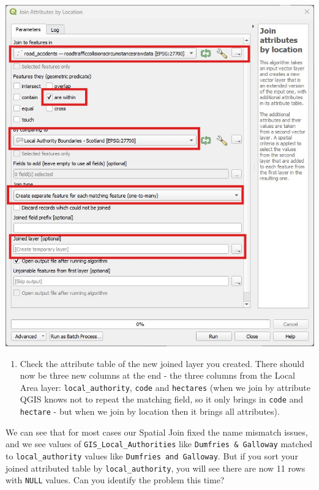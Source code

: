 \documentclass[
  letterpaper,
  DIV=11,
  numbers=noendperiod]{scrreprt}
\providecommand{\tightlist}{%
  \setlength{\itemsep}{0pt}\setlength{\parskip}{0pt}}\usepackage{longtable,booktabs,array}
\begin{document}
\includegraphics{images/lab_11/lab_11_fig_5_spatial_join.jpg}

\begin{enumerate}
\def\labelenumi{(\arabic{enumi})}
\setcounter{enumi}{316}
\tightlist
\item
  Check the attribute table of the new joined layer you created. There
  should now be three new columns at the end - the three columns from
  the Local Area layer: \texttt{local\_authority}, \texttt{code} and
  \texttt{hectares} (when we join by attribute QGIS knows not to repeat
  the matching field, so it only brings in \texttt{code} and
  \texttt{hectare} - but when we join by location then it brings all
  attributes).
\end{enumerate}

\begin{tcolorbox}[enhanced jigsaw, coltitle=black, toprule=.15mm, breakable, opacitybacktitle=0.6, left=2mm, colback=white, leftrule=.75mm, rightrule=.15mm, colbacktitle=quarto-callout-important-color!10!white, toptitle=1mm, titlerule=0mm, colframe=quarto-callout-important-color-frame, arc=.35mm, bottomtitle=1mm, opacityback=0, bottomrule=.15mm, title=\textcolor{quarto-callout-important-color}{\faExclamation}\hspace{0.5em}{Stop and Think}]

We can see that for most cases our Spatial Join fixed the name mismatch
issues, and we see values of \texttt{GIS\_Local\_Authorities} like
\texttt{Dumfries\ \&\ Galloway} matched to \texttt{local\_authority}
values like \texttt{Dumfries\ and\ Galloway}. But if you sort your
joined attributed table by \texttt{local\_authority}, you will see there
are now 11 rows with \texttt{NULL} values. Can you identify the problem
this time?

\end{tcolorbox}
\end{document}
